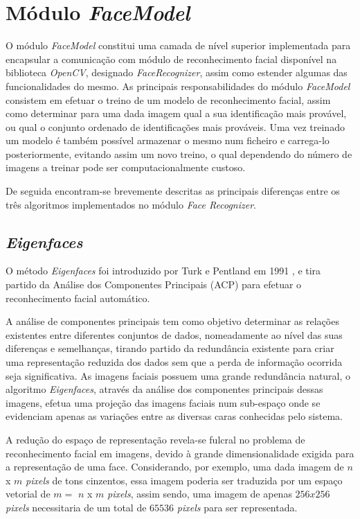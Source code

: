 \section{Módulo \textit{FaceModel}}
O módulo \textit{FaceModel} constitui uma camada de nível superior implementada para encapsular a comunicação com módulo de reconhecimento facial disponível na biblioteca \textit{OpenCV}, designado \textit{FaceRecognizer}, assim como estender algumas das funcionalidades do mesmo. As principais responsabilidades do módulo \textit{FaceModel} consistem em efetuar o treino de um modelo de reconhecimento facial, assim como determinar para uma dada imagem qual a sua identificação mais provável, ou qual o conjunto ordenado de identificações mais prováveis. Uma vez treinado um modelo é também possível armazenar o mesmo num ficheiro e carrega-lo posteriormente, evitando assim um novo treino, o qual dependendo do número de imagens a treinar pode ser computacionalmente custoso.

De seguida encontram-se brevemente descritas as principais diferenças entre os três algoritmos implementados no módulo \textit{Face Recognizer}.

\subsection{\textit{Eigenfaces}}
O método \textit{Eigenfaces} foi introduzido por Turk e Pentland em 1991 \cite{Turk1991}, e tira partido da Análise dos Componentes Principais (ACP) para efetuar o reconhecimento facial automático.

A análise de componentes principais tem como objetivo determinar as relações existentes entre diferentes conjuntos de dados, nomeadamente ao nível das suas diferenças e semelhanças, tirando partido da redundância existente para criar uma representação reduzida dos dados sem que a perda de informação ocorrida seja significativa. As imagens faciais possuem uma grande redundância natural, o algoritmo \textit{Eigenfaces}, através da análise dos componentes principais dessas imagens, efetua uma projeção das imagens faciais num sub-espaço onde se evidenciam apenas as variações entre as diversas caras conhecidas pelo sistema.

A redução do espaço de representação revela-se fulcral no problema de reconhecimento facial em imagens, devido à grande dimensionalidade exigida para a representação de uma face. Considerando, por exemplo, uma dada imagem de $n$ x $m$ \textit{pixels} de tons cinzentos, essa imagem poderia ser traduzida por um espaço vetorial de $m = $ $n$ x $m$ \textit{pixels}, assim sendo, uma imagem de apenas $256x256$ \textit{pixels} necessitaria de um total de $65536$ \textit{pixels} para ser representada.

